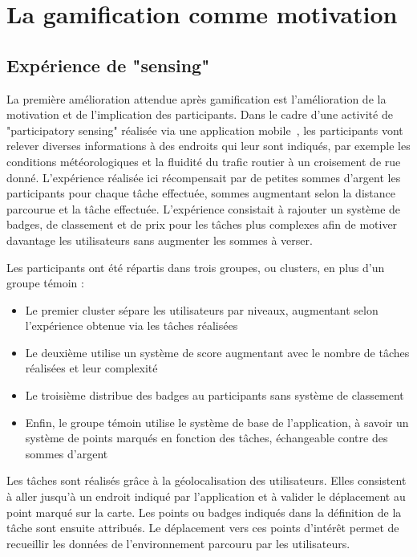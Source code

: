 \section{La gamification comme motivation}
\subsection{Expérience de "sensing"}
La première amélioration attendue après gamification est l'amélioration de la motivation et de l'implication des participants. Dans le cadre d'une activité de "participatory sensing" réalisée via une application mobile~\cite{gamif-partici},  les participants vont relever diverses informations à des endroits qui leur sont indiqués, par exemple les conditions météorologiques et la fluidité du trafic routier à un croisement de rue donné. L'expérience réalisée ici récompensait par de petites sommes d'argent les participants pour chaque tâche effectuée, sommes augmentant selon la distance parcourue et la tâche effectuée. L'expérience consistait à rajouter un système de badges, de classement et de prix pour les tâches plus complexes afin de motiver davantage les utilisateurs sans augmenter les sommes à verser.\par

Les participants ont été répartis dans trois groupes, ou clusters, en plus d'un groupe témoin :
\begin{itemize}
    \item Le premier cluster sépare les utilisateurs par niveaux, augmentant selon l'expérience obtenue via les tâches réalisées
    \item Le deuxième utilise un système de score augmentant avec le nombre de tâches réalisées et leur complexité
    \item Le troisième distribue des badges au participants sans système de classement
    \item Enfin, le groupe témoin utilise le système de base de l'application, à savoir un système de points marqués en fonction des tâches, échangeable contre des sommes d'argent
\end{itemize} \par

Les tâches sont réalisés grâce à la géolocalisation des utilisateurs. Elles consistent à aller jusqu’à un endroit indiqué par l’application et à valider  le déplacement au point marqué sur la carte. Les points ou badges indiqués dans la définition de la tâche sont ensuite attribués. Le déplacement vers ces points d’intérêt permet de recueillir les données de l’environnement parcouru par les utilisateurs.


